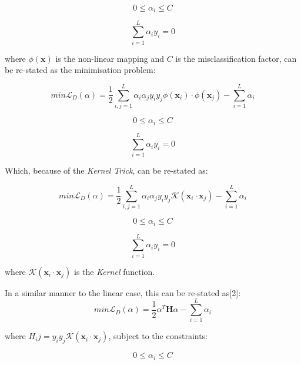 \documentclass[10pt, a4paper,reqno]{amsart}
\begin{document}
\begin{equation}
0\leq\alpha_i\leq C
\end{equation}

\begin{equation}
\sum_{i=1}^{L}\alpha_i y_i = 0
\end{equation}

where $\phi(\mathbf{x})$ is the non-linear mapping and $C$ is the misclassification factor, can be re-stated as the minimisation problem:

\begin{equation}
min\mathcal{L}_D(\alpha) = \frac{1}{2}\sum_{i,j=1}^{L}\alpha_i \alpha_j y_i y_j\phi(\mathbf{x}_i)\cdot\phi(\mathbf{x}_j) - \sum_{i=1}^{L}\alpha_i
\end{equation}

\begin{equation}
0\leq\alpha_i\leq C
\end{equation}

\begin{equation}
\sum_{i=1}^{L}\alpha_i y_i = 0
\end{equation}

Which, because of the \emph{Kernel Trick}, can be re-stated as:

\begin{equation}
min\mathcal{L}_D(\alpha) = \frac{1}{2}\sum_{i,j=1}^{L}\alpha_i \alpha_j y_i y_j\mathcal{K}(\mathbf{x}_i\cdot\mathbf{x}_j) - \sum_{i=1}^{L}\alpha_i
\end{equation}

\begin{equation}
0\leq\alpha_i\leq C
\end{equation}

\begin{equation}
\sum_{i=1}^{L}\alpha_i y_i = 0
\end{equation}

where $\mathcal{K}(\mathbf{x}_i\cdot\mathbf{x}_j)$ is the \emph{Kernel} function.

In a similar manner to the linear case, this can be re-stated as[2]:
\begin{equation}
min\mathcal{L}_D(\alpha) = \frac{1}{2}\alpha^T\mathbf{H}\alpha - \sum_{i=1}^{L}\alpha_i
\end{equation}

where $H_ij = y_i y_j \mathcal{K}(\mathbf{x}_i\cdot\mathbf{x}_j)$, subject to the constraints:

\begin{equation}
0\leq\alpha_i\leq C
\end{equation}
\end{document}
